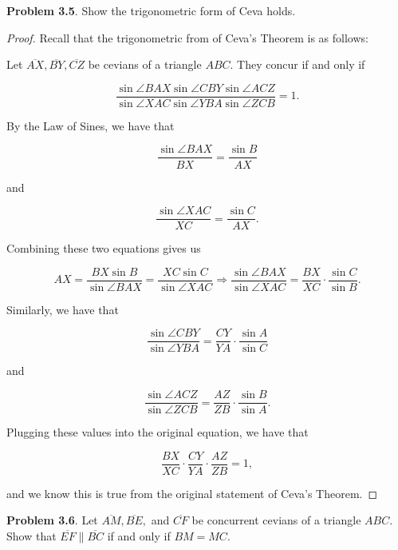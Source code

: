 \documentclass[letterpaper,oneside]{book}
\begin{document}
  \textbf{Problem 3.5}.   Show the trigonometric form of Ceva holds.

 \begin{proof}  Recall that the trigonometric from of Ceva's Theorem is as follows:

Let $\overline{AX}, \overline{BY}, \overline{CZ}$ be cevians of a triangle $ABC.$ They concur if and only if 

$$\frac{\sin \angle BAX \sin \angle CBY \sin \angle ACZ}{\sin \angle XAC \sin \angle YBA \sin \angle ZCB} = 1.$$

By the Law of Sines, we have that

$$\frac{\sin\angle BAX}{BX} = \frac{\sin B}{AX}$$

and

$$\frac{\sin\angle XAC}{XC} = \frac{\sin C}{AX}.$$

Combining these two equations gives us

$$AX = \frac{BX \sin B}{\sin\angle BAX}=\frac{XC \sin C}{\sin\angle XAC} \Rightarrow \frac{\sin \angle BAX}{\sin \angle XAC} = \frac{BX}{XC} \cdot \frac{\sin C}{\sin B}.$$

Similarly, we have that 

$$\frac{\sin \angle CBY}{\sin \angle YBA} = \frac{CY}{YA}\cdot \frac{\sin A}{\sin C} $$

and

$$
\frac{\sin \angle ACZ}{\sin \angle ZCB} = \frac{AZ}{ZB}\cdot \frac{\sin B}{\sin A}. $$

Plugging these values into the original equation, we have that

$$\frac{BX}{XC}\cdot \frac{CY}{YA} \cdot \frac{AZ}{ZB} = 1,$$

and we know this is true from the original statement of Ceva's Theorem.
\end{proof}



 \textbf{ Problem 3.6}.   Let $\overline{AM}, \overline{BE},$ and $\overline{CF}$ be concurrent cevians of a triangle $ABC.$ Show that $\overline{EF} \parallel \overline{BC}$ if and only if $BM = MC.$
\end{document}
